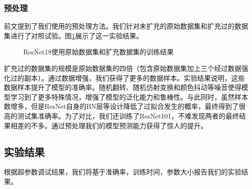 \documentclass[hyperref, UTF8, 12pt]{article}
\theoremstyle{definition}
\begin{document}
\subsubsection{预处理}
前文提到了我们使用的预处理方法。我们针对未扩充的原始数据集和扩充过的数据集进行了对照试验。图\ref{fig:resnet18_amp}展示了这一实验结果。
\begin{figure}[H]
	\centering
	\caption{ResNet18使用原始数据集和扩充数据集的训练结果}
	\label{fig:resnet18_amp}
\end{figure}
扩充过的数据集的规模是原始数据集的四倍（包含原始数据集加上三个经过数据强化过的副本）。通过数据增强，我们获得了更多的数据样本。实验结果说明，这些数据样本提升了模型的准确率。随机翻转、随机仿射变换和颜色抖动等噪音使得模型学习到了更多特殊情况，增强了模型的泛化能力和鲁棒性。与此同时，虽然样本数增多，但是ResNet自身的BN层等设计降低了过拟合发生的概率，最终得到了很高的测试集准确率。为了对比，我们还训练了ResNet101，不难发现两者的最终结果相差的不多。通过预处理我们的模型预测能力获得了惊人的提升。

\subsection{实验结果}
根据超参数调试结果，我们将基于准确率，训练时间，参数大小报告我们的实验结果。
\end{document}
